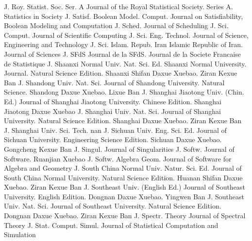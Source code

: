 {J. Roy. Statist. Soc. Ser. A}
{Journal of the Royal Statistical Society. Series A. Statistics in Society}
{J. Satisf. Boolean Model. Comput.}
{Journal on Satisfiability, Boolean Modeling and Computation}
{J. Sched.}
{Journal of Scheduling}
{J. Sci. Comput.}
{Journal of Scientific Computing}
{J. Sci. Eng. Technol.}
{Journal of Science, Engineering and Technology}
{J. Sci. Islam. Repub. Iran}
{Islamic Republic of Iran. Journal of Sciences}
{J. SFdS}
{Journal de la SFdS. Journal de la Societe Francaise de Statistique}
{J. Shaanxi Normal Univ. Nat. Sci. Ed.}
{Shaanxi Normal University. Journal. Natural Science Edition. Shaanxi Shifan Daxue Xuebao. Ziran Kexue Ban}
{J. Shandong Univ. Nat. Sci.}
{Journal of Shandong University. Natural Science. Shandong Daxue Xuebao. Lixue Ban}
{J. Shanghai Jiaotong Univ. (Chin. Ed.)}
{Journal of Shanghai Jiaotong University. Chinese Edition. Shanghai Jiaotong Daxue Xuebao}
{J. Shanghai Univ. Nat. Sci.}
{Journal of Shanghai University. Natural Science Edition. Shanghai Daxue Xuebao. Ziran Kexue Ban}
{J. Shanghai Univ. Sci. Tech.}
{nan}
{J. Sichuan Univ. Eng. Sci. Ed.}
{Journal of Sichuan University. Engineering Science Edition. Sichuan Daxue Xuebao. Gongcheng Kexue Ban}
{J. Singul.}
{Journal of Singularities}
{J. Softw.}
{Journal of Software. Ruanjian Xuebao}
{J. Softw. Algebra Geom.}
{Journal of Software for Algebra and Geometry}
{J. South China Normal Univ. Natur. Sci. Ed.}
{Journal of South China Normal University. Natural Science Edition. Huanan Shifan Daxue Xuebao. Ziran Kexue Ban}
{J. Southeast Univ. (English Ed.)}
{Journal of Southeast University. English Edition. Dongnan Daxue Xuebao. Yingwen Ban}
{J. Southeast Univ. Nat. Sci.}
{Journal of Southeast University. Natural Science Edition. Dongnan Daxue Xuebao. Ziran Kexue Ban}
{J. Spectr. Theory}
{Journal of Spectral Theory}
{J. Stat. Comput. Simul.}
{Journal of Statistical Computation and Simulation}
